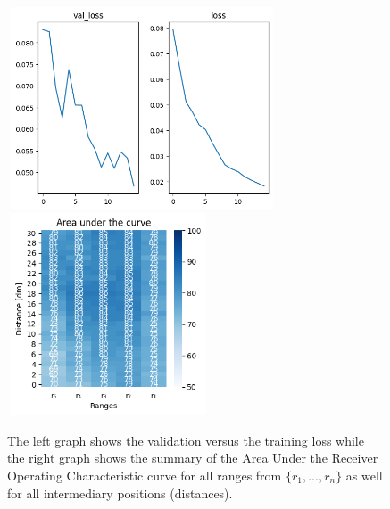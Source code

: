 \begin{multicols}{2}
\end{multicols}\begin{figure}[H]%
\centering
\includegraphics[width=8cm,height=6cm]{3_models/models_10/graph_10.png}
\hspace{0.2 cm}
\includegraphics[width=6cm,height=6cm]{4_plots/plots_10/AUC_10.png}
\caption{The left graph shows the validation versus the training loss while the right graph shows the summary of the Area Under the Receiver Operating Characteristic curve for all ranges from $\{r_{1}, ... ,r_{n}\}$ as well for all intermediary positions (distances).}
\label{auc_10}
\end{figure}

\newpage
